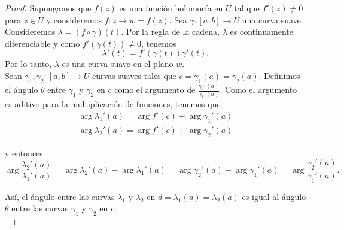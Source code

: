 \begin{proof}
    Supongamos que $f(z)$ es una función holomorfa en $U$ tal que $f'(z) \not = 0$ para $z \in U$ y consideremos $f:z \to w=f(z)$. Sea $\gamma: [a,b] \to U$ una curva suave. Consideremos $\lambda = (f \circ  \gamma)(t)$. Por la regla de la cadena, $\lambda$ es continuamente diferenciable y como $f'(\gamma(t)) \not = 0$, tenemos
    \begin{equation}
        \label{eq:cadena}
        \lambda'(t) = f'(\gamma(t))\gamma'(t).
    \end{equation}
    Por lo tanto, $\lambda$ es una curva suave en el plano $w$. \\

    Sean $\gamma_1, \gamma_2: [a,b] \to U$ curvas suaves tales que $c=\gamma_1(a) = \gamma_2(a)$. Definimos el ángulo $\theta$ entre $\gamma_1$ y $\gamma_2$ en $c$ como el argumento de $\frac{\gamma_2'(a)}{\gamma_1'(a)}$. Como el argumento es aditivo para la multiplicación de funciones, tenemos que
    \begin{equation*}
    \begin{split}
        \arg \lambda_1'(a) = \arg f'(c) + \arg \gamma_1'(a)\\
        \arg \lambda_2'(a) = \arg f'(c) + \arg \gamma_2'(a)
    \end{split}
    \end{equation*}

    y entonces
    \begin{equation*}
        \arg  \frac{\lambda_2'(a)}{\lambda_1'(a)} = \arg \lambda_2'(a) - \arg \lambda_1'(a) = \arg \gamma_2'(a) - \arg \gamma_1'(a) = \arg  \frac{\gamma_2'(a)}{\gamma_1'(a)}.
    \end{equation*}

    Así, el ángulo entre las curvas $\lambda_1$ y $\lambda_2$ en $d = \lambda_1(a) = \lambda_2(a)$ es igual al ángulo $\theta$ entre las curvas $\gamma_1$ y $\gamma_2$ en $c$. \\
\end{proof}

